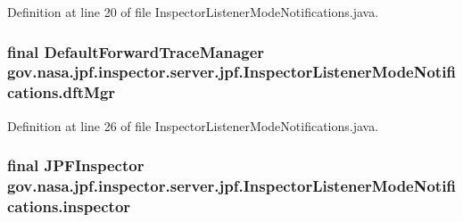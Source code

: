 Definition at line 20 of file Inspector\+Listener\+Mode\+Notifications.\+java.

\subsubsection[{\texorpdfstring{dft\+Mgr}{dftMgr}}]{\setlength{\rightskip}{0pt plus 5cm}final {\bf Default\+Forward\+Trace\+Manager} gov.\+nasa.\+jpf.\+inspector.\+server.\+jpf.\+Inspector\+Listener\+Mode\+Notifications.\+dft\+Mgr\hspace{0.3cm}{\ttfamily [private]}}\hypertarget{classgov_1_1nasa_1_1jpf_1_1inspector_1_1server_1_1jpf_1_1_inspector_listener_mode_notifications_ab13a838dedd020e2905d89f9c1bf8209}{}\label{classgov_1_1nasa_1_1jpf_1_1inspector_1_1server_1_1jpf_1_1_inspector_listener_mode_notifications_ab13a838dedd020e2905d89f9c1bf8209}


Definition at line 26 of file Inspector\+Listener\+Mode\+Notifications.\+java.

\subsubsection[{\texorpdfstring{inspector}{inspector}}]{\setlength{\rightskip}{0pt plus 5cm}final {\bf J\+P\+F\+Inspector} gov.\+nasa.\+jpf.\+inspector.\+server.\+jpf.\+Inspector\+Listener\+Mode\+Notifications.\+inspector\hspace{0.3cm}{\ttfamily [private]}}\hypertarget{classgov_1_1nasa_1_1jpf_1_1inspector_1_1server_1_1jpf_1_1_inspector_listener_mode_notifications_a5db31a7d96790e2bdd746fac8b0f6291}{}\label{classgov_1_1nasa_1_1jpf_1_1inspector_1_1server_1_1jpf_1_1_inspector_listener_mode_notifications_a5db31a7d96790e2bdd746fac8b0f6291}


